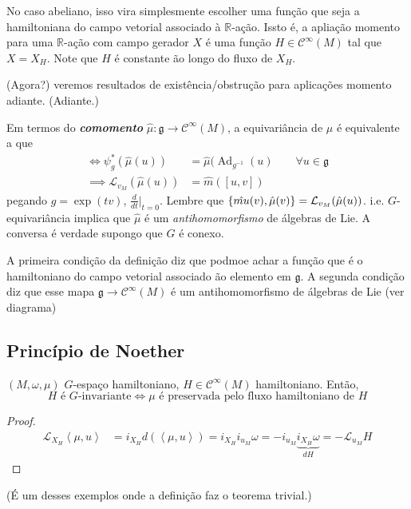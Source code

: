 \begin{example}\leavevmode
No caso abeliano, isso vira simplesmente escolher uma função que seja a hamiltoniana do campo vetorial associado à $ \mathbb{R}$-ação. Issto é, a apliação momento para uma $\mathbb{R}$-ação com campo gerador $X$ é uma função $H\in\mathcal{C}^\infty(M)$ tal que $X=X_H$. Note que  $H$ é constante ão longo do fluxo de $X_H$.
	\end{example}

	(Agora?) veremos resultados de existência/obstrução para aplicações momento adiante. (Adiante.)

\begin{remark}\leavevmode
	Em termos do \textit{\textbf{comomento}}  $\hat{\mu}:\mathfrak{g}\longrightarrow \mathcal{C}^\infty(M)$, a equivariância de $\mu$ é equivalente a que
	\begin{align*}
		\iff \psi^* _g(\hat{\mu}(u))&=\hat{\mu}(\operatorname{Ad}_{g^{-1}}(u)\qquad \forall u\in\mathfrak{g}\\
		\implies \mathcal{L}_{v_M}(\hat{\mu}(u))&=\hat{m}\left( [u,v] \right) 
	\end{align*}
	pegando $g=\operatorname{exp}(tv)$, $\frac{d}{dt}\Big|_{t=0}$. Lembre que $\{\hat{\\mu}(v),\hat{\mu}(v)\} =\mathcal{L}_{v_M}(\hat{\mu}(u))$.
	i.e. $G$-equivariância implica que $\hat{\mu}$ é um \textit{antihomomorfismo} de álgebras de Lie. A conversa é verdade supongo que $G$ é conexo.
\end{remark}

\begin{remark}\leavevmode
	A primeira condição da definição diz que podmoe achar a função que é o hamiltoniano do campo vetorial associado ão elemento em $\mathfrak{g}$. A segunda condição diz que esse mapa $\mathfrak{g} \longrightarrow \mathcal{C}^\infty(M)$ é um antihomomorfismo de álgebras de Lie (ver diagrama)
\end{remark}

\subsection{Princípio de Noether}

$(M,\omega,\mu)$ $G$-espaço hamiltoniano, $H\in\mathcal{C}^\infty(M)$ hamiltoniano. Então,
\[H \text{ é $G$-invariante}\iff \mu\text{ é preservada pelo fluxo hamiltoniano de }H  \]
\begin{proof}\leavevmode
	\begin{align*}
		\mathcal{L}_{X_H}\left<\mu,u\right> &=i_{X_H}d(\left<\mu,u\right> )=i_{X_H}i_{u_M} \omega=-i_{u_M} \underbrace{i_{X_H}\omega}_{dH}=-\mathcal{L}_{u_M}H
	\end{align*}
\end{proof}
(É um desses exemplos onde a definição faz o teorema trivial.)

